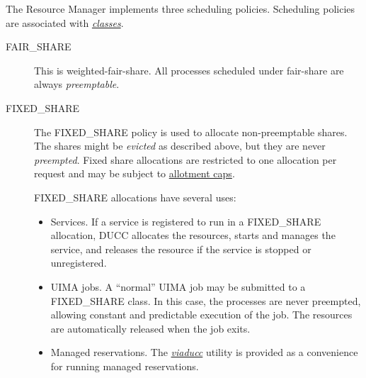     The Resource Manager implements three scheduling policies. Scheduling policies are
    associated with \hyperref[sec:rm.job-classes]{\em classes}.
    \begin{description}
        \item[FAIR\_SHARE] This is weighted-fair-share.  All processes scheduled under
           fair-share are always {\em preemptable}.

        \item[FIXED\_SHARE] The FIXED\_SHARE policy is used to allocate non-preemptable
          shares.  The shares might be {\em evicted} as described above, but they are 
          never {\em preempted}.  Fixed share allocations are restricted to one
          allocation per request and may be subject to \hyperref[sec:rm.allotment]{allotment caps}.

          FIXED\_SHARE allocations have several uses:
          \begin{itemize}
            \item Services.  If a service is registered to run in a FIXED\_SHARE allocation,
              DUCC allocates the resources, starts and manages the service, and releases the
              resource if the service is stopped or unregistered.
            \item UIMA jobs.  A ``normal'' UIMA job may be submitted to a FIXED\_SHARE
              class.  In this case, the processes are never preempted, allowing constant and
              predictable execution of the job.  The resources are automatically released when
              the job exits.
            \item Managed reservations.  The \hyperref[sec:cli.viaducc]{\em viaducc} utility is provided 
              as a convenience for running managed reservations.
          \end{itemize}                    
          

\end{description}

